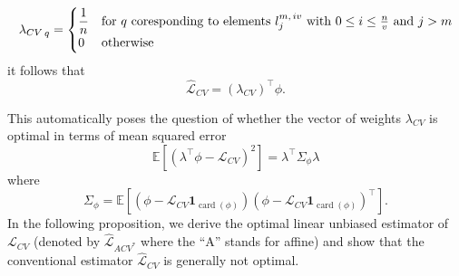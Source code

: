 \documentclass[11pt,dvipsnames]{article}
\DeclareMathOperator{\cardt}{card}
\begin{document}
\begin{equation}
\left. \lambda_{CV}\right._{q}=
\begin{cases}
\dfrac{1}{n} & \text{for $ q $ coresponding to elements $ l_{j}^{m,\,iv } $ with $ 0\leq i \leq \frac{n}{v} $ and $ j>m $}\\
0 & \text{otherwise} 
\end{cases}
\end{equation}
it follows that 
\begin{equation}\label{eq:CVIdentity} 
\widehat{\mathcal{L}}_{CV}= (\lambda_{CV})^{\top} \phi.
\end{equation}

This automatically poses the question of whether the vector of weights $ \lambda_{CV} $ is optimal in terms of mean squared error
\begin{equation}
\mathbb{E}\left[ \left( \lambda^{\top}\phi-\mathcal{L}_{CV} \right)^{2}    \right]  = \lambda^{\top} \Sigma_{\phi} \lambda 
\end{equation}
where
\begin{equation}
\Sigma_{\phi}=\mathbb{E}\left[ (\phi-\mathcal{L}_{CV} \mathbf{1}_{\cardt(\phi)})(\phi-\mathcal{L}_{CV} \mathbf{1}_{\cardt(\phi)})^{\top} \right] .
\end{equation}
In the following proposition, we derive the optimal linear unbiased estimator of $ \mathcal{L}_{CV} $ (denoted by $ \widehat{\mathcal{L}}_{ACV^{*}} $ where the ``A'' stands for affine) and show that the conventional estimator $ \widehat{\mathcal{L}}_{CV} $ is generally not optimal.
\end{document}
